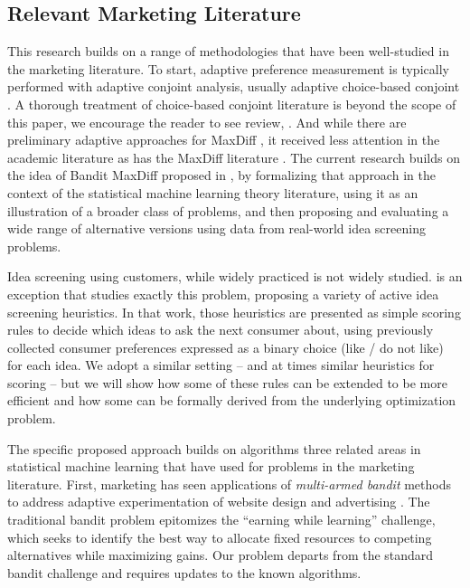 \documentclass[nonblindrev]{informs3}
\begin{document}
\subsection{Relevant Marketing Literature}

This research builds on a range of methodologies that have been well-studied in the marketing literature. To start, adaptive preference measurement is typically performed with adaptive conjoint analysis, usually adaptive choice-based conjoint \citep{arora2001improving,toubia2003fast,toubia2004polyhedral}. A thorough treatment of choice-based conjoint literature is beyond the scope of this paper, we encourage the reader to see review, \cite{toubia2007chapter}. And while there are preliminary adaptive approaches for MaxDiff \citep{orme2006adaptive}, it received less attention in the academic literature as has the MaxDiff literature \citep{cohen2003maximum}. The current research builds on the idea of Bandit MaxDiff proposed in \cite{fairchildetal2015banditmaxdiff}, by formalizing that approach in the context of the statistical machine learning theory literature, using it as an illustration of a broader class of problems, and then proposing and evaluating a wide range of alternative versions using data from real-world idea screening problems.

Idea screening using customers, while widely practiced is not widely studied. \cite{toubia2007adaptive} is an exception that studies exactly this problem, proposing a variety of active idea screening heuristics. In that work, those heuristics are presented as simple scoring rules to decide which ideas to ask the next consumer about, using previously collected consumer preferences expressed as a binary choice (like / do not like) for each idea. We adopt a similar setting -- and at times similar heuristics for scoring -- but we will show how some of these rules can be extended to be more efficient and how some can be formally derived from the underlying optimization problem.

The specific proposed approach builds on algorithms three related areas in statistical machine learning that have used for problems in the marketing literature. First, marketing has seen applications of \emph{multi-armed bandit} methods to address adaptive experimentation of website design and advertising \citep{HauserEtAl2009,schwartzetal2017,urban2013morphing}. The traditional bandit problem epitomizes the ``earning while learning'' challenge, which seeks to identify the best way to allocate fixed resources to competing alternatives while maximizing gains. Our problem departs from the standard bandit challenge and requires updates to the known algorithms.
\end{document}
